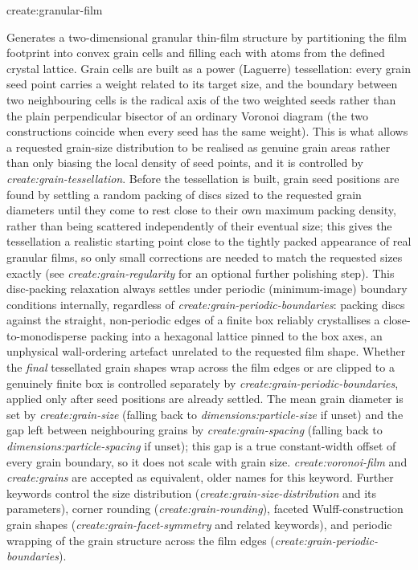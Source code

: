 {\zicf create:granular-film} Generates a two-dimensional granular thin-film structure by partitioning the film footprint into convex grain cells and filling each with atoms from the defined crystal lattice. Grain cells are built as a power (Laguerre) tessellation: every grain seed point carries a weight related to its target size, and the boundary between two neighbouring cells is the radical axis of the two weighted seeds rather than the plain perpendicular bisector of an ordinary Voronoi diagram (the two constructions coincide when every seed has the same weight). This is what allows a requested grain-size distribution to be realised as genuine grain areas rather than only biasing the local density of seed points, and it is controlled by \textit{create:grain-tessellation}. Before the tessellation is built, grain seed positions are found by settling a random packing of discs sized to the requested grain diameters until they come to rest close to their own maximum packing density, rather than being scattered independently of their eventual size; this gives the tessellation a realistic starting point close to the tightly packed appearance of real granular films, so only small corrections are needed to match the requested sizes exactly (see \textit{create:grain-regularity} for an optional further polishing step). This disc-packing relaxation always settles under periodic (minimum-image) boundary conditions internally, regardless of \textit{create:grain-periodic-boundaries}: packing discs against the straight, non-periodic edges of a finite box reliably crystallises a close-to-monodisperse packing into a hexagonal lattice pinned to the box axes, an unphysical wall-ordering artefact unrelated to the requested film shape. Whether the \emph{final} tessellated grain shapes wrap across the film edges or are clipped to a genuinely finite box is controlled separately by \textit{create:grain-periodic-boundaries}, applied only after seed positions are already settled. The mean grain diameter is set by \textit{create:grain-size} (falling back to \textit{dimensions:particle-size} if unset) and the gap left between neighbouring grains by \textit{create:grain-spacing} (falling back to \textit{dimensions:particle-spacing} if unset); this gap is a true constant-width offset of every grain boundary, so it does not scale with grain size. \textit{create:voronoi-film} and \textit{create:grains} are accepted as equivalent, older names for this keyword. Further keywords control the size distribution (\textit{create:grain-size-distribution} and its parameters), corner rounding (\textit{create:grain-rounding}), faceted Wulff-construction grain shapes (\textit{create:grain-facet-symmetry} and related keywords), and periodic wrapping of the grain structure across the film edges (\textit{create:grain-periodic-boundaries}).

